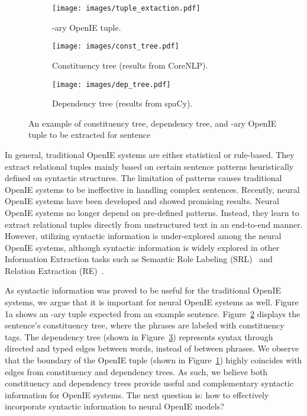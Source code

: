 \documentclass[11pt]{article}
\begin{document}
\begin{figure}[t]
\centering
\begin{subfigure}[b]{1\linewidth}
   \centering
   \texttt{[image: images/tuple\_extaction.pdf]}
   \caption{-ary OpenIE tuple.}
   \label{fig:tuple_extraction}
\end{subfigure}
\begin{subfigure}[b]{1\linewidth}
   \centering
   \texttt{[image: images/const\_tree.pdf]}
   \caption{Constituency tree (results from CoreNLP).}
   \label{fig:const_tree}
\end{subfigure}
\begin{subfigure}[b]{1\linewidth}
   \centering
   \texttt{[image: images/dep\_tree.pdf]}
   \caption{Dependency tree (results from spaCy).}
   \label{fig:dep_tree}
\end{subfigure}
\vspace{-1.5em}
\caption{An example of constituency tree, dependency tree, and -ary OpenIE tuple to be extracted for sentence }
\label{fig:syc_sentence}
\end{figure}


In general, traditional OpenIE systems are either statistical or rule-based. They extract relational tuples mainly based on certain sentence patterns heuristically defined on syntactic structures. 
The limitation of patterns causes traditional OpenIE systems to be ineffective in handling complex sentences.
Recently, neural OpenIE systems have been developed and showed promising results. Neural OpenIE systems no longer depend on pre-defined patterns.
Instead, they learn to extract relational tuples directly from unstructured text in an end-to-end manner.
However, utilizing syntactic information is under-explored among the neural OpenIE systems, although syntactic information is widely explored in other Information Extraction tasks such as Semantic Role Labeling (SRL)~\cite{fei-etal-2021-better} and Relation Extraction (RE)~\cite{zhang-etal-2018-graph}.

 
As syntactic information was proved to be useful for the traditional OpenIE systems, we argue that it is important for neural OpenIE systems as well. 
Figure 1a shows an -ary tuple expected from an example sentence. 
Figure~\ref{fig:const_tree} displays the sentence's constituency tree, where the phrases are labeled with constituency tags.
The dependency tree (shown in Figure~\ref{fig:dep_tree}) represents syntax through directed and typed edges between words, instead of between phrases.
We observe that the boundary of the OpenIE tuple (shown in Figure~\ref{fig:tuple_extraction}) highly coincides with edges from constituency and dependency trees.
As such, we believe both constituency and dependency trees provide useful and complementary syntactic information for OpenIE systems.
The next question is: how to effectively incorporate syntactic information to neural OpenIE models? 
\end{document}
